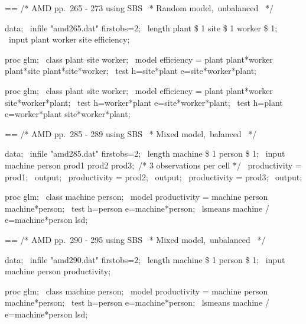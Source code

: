\documentclass{book}
\makeatletter
\newenvironment{Texinfopreformatted}{%
  \par\GNUTobeylines\obeyspaces\frenchspacing\parskip=\z@\parindent=\z@}{}
{\catcode`\^^M=13 \gdef\GNUTobeylines{\catcode`\^^M=13 \def^^M{\null\par}}}
\newenvironment{Texinfoindented}{\begin{list}{}{}\item\relax}{\end{list}}
\renewcommand{\_}{\Texinfounderscore\discretionary{}{}{}}
\makeatother
\begin{document}
\begin{Texinfoindented}
\begin{Texinfopreformatted}%
\ttfamily 
/* AMD pp.\ 265 - 273 using SBS
\ * Random model,\ unbalanced
\ */

data;
\ infile "amd265.dat" firstobs=2;
\ length plant \$ 1 site \$ 1 worker \$ 1;
\ input plant worker site efficiency;

proc glm;
\ class plant site worker;
\ model efficiency = plant plant*worker plant*site plant*site*worker;
\ test h=site*plant e=site*worker*plant;

proc glm;
\ class plant site worker;
\ model efficiency = plant plant*worker site*worker*plant;
\ test h=worker*plant e=site*worker*plant;
\ test h=plant e=worker*plant site*worker*plant;


\end{Texinfopreformatted}
\end{Texinfoindented}

\begin{Texinfoindented}
\begin{Texinfopreformatted}%
\ttfamily 
/* AMD pp.\ 285 - 289 using SBS
\ * Mixed model,\ balanced
\ */

data;
\ infile "amd285.dat" firstobs=2;
\ length machine \$ 1 person \$ 1;
\ input machine person prod1 prod2 prod3;\ /* 3 observations per cell */
\ productivity = prod1;
\ output;
\ productivity = prod2;
\ output;
\ productivity = prod3;
\ output;

proc glm;
\ class machine person;
\ model productivity = machine person machine*person;
\ test h=person e=machine*person;
\ lsmeans machine / e=machine*person lsd;


\end{Texinfopreformatted}
\end{Texinfoindented}

\begin{Texinfoindented}
\begin{Texinfopreformatted}%
\ttfamily 
/* AMD pp.\ 290 - 295 using SBS
\ * Mixed model,\ unbalanced
\ */

data;
\ infile "amd290.dat" firstobs=2;
\ length machine \$ 1 person \$ 1;
\ input machine person productivity;

proc glm;
\ class machine person;
\ model productivity = machine person machine*person;
\ test h=person e=machine*person;
\ lsmeans machine / e=machine*person lsd;


\end{Texinfopreformatted}
\end{Texinfoindented}
\end{document}
